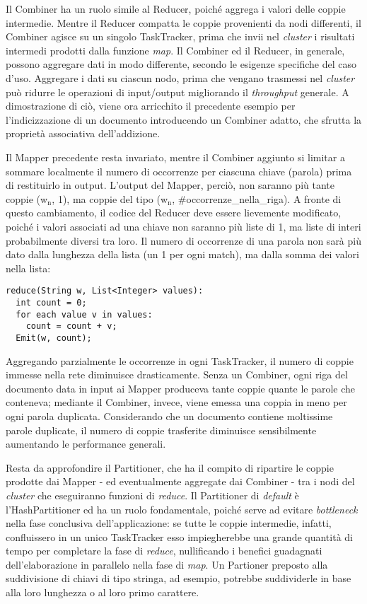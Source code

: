 Il Combiner ha un ruolo simile al Reducer, poiché aggrega i valori delle coppie intermedie. Mentre il Reducer compatta le coppie provenienti da nodi differenti, il Combiner 
agisce su un singolo TaskTracker, prima che invii nel \textit{cluster} i risultati intermedi prodotti dalla funzione \textit{map}. Il Combiner ed il Reducer, in generale, possono aggregare dati 
in modo differente, secondo le esigenze specifiche del caso d’uso. Aggregare i dati su ciascun nodo, prima che vengano trasmessi nel \textit{cluster} può ridurre le operazioni di 
input/output migliorando il \textit{throughput} generale. A dimostrazione di ciò, viene ora arricchito il precedente esempio per l’indicizzazione di un documento introducendo un Combiner 
adatto, che sfrutta la proprietà associativa dell’addizione.

Il Mapper precedente resta invariato, mentre il Combiner aggiunto si limitar a sommare localmente il numero di occorrenze per ciascuna chiave (parola) prima di restituirlo in output. 
L’output del Mapper, perciò, non saranno più tante coppie (w$_{\mathrm{n}}$, 1), ma coppie del tipo (w$_{\mathrm{n}}$, \#occorrenze\_nella\_riga). A fronte di questo cambiamento, il codice del Reducer deve essere
lievemente modificato, poiché i valori associati ad una chiave non saranno più liste di 1, ma liste di interi probabilmente diversi tra loro. Il numero di occorrenze di una parola 
non sarà più dato dalla lunghezza della lista (un 1 per ogni match), ma dalla somma dei valori nella lista: 

\begin{lstlisting}[frame=single]
reduce(String w, List<Integer> values):
  int count = 0;
  for each value v in values:
    count = count + v;
  Emit(w, count);
\end{lstlisting}

Aggregando parzialmente le occorrenze in ogni TaskTracker, il numero di coppie immesse nella rete diminuisce drasticamente. Senza un Combiner, ogni riga del documento data in 
input ai Mapper produceva tante coppie quante le parole che conteneva; mediante il Combiner, invece, viene emessa una coppia in meno per ogni parola duplicata. Considerando che
un documento contiene moltissime parole duplicate, il numero di coppie trasferite diminuisce sensibilmente aumentando le performance generali.

Resta da approfondire il Partitioner, che ha il compito di ripartire le coppie prodotte dai Mapper - ed eventualmente aggregate dai Combiner - tra i nodi del \textit{cluster} che 
eseguiranno funzioni di \textit{reduce}. Il Partitioner di \textit{default} è l’HashPartitioner ed ha un ruolo fondamentale, poiché serve ad evitare \textit{bottleneck} nella fase conclusiva dell’applicazione:
se tutte le coppie intermedie, infatti, confluissero in un unico TaskTracker esso impiegherebbe una grande quantità di tempo per completare la fase di \textit{reduce}, nullificando i 
benefici guadagnati dell’elaborazione in parallelo nella fase di \textit{map}. Un Partioner preposto alla suddivisione di chiavi di tipo stringa, ad esempio, potrebbe suddividerle in base 
alla loro lunghezza o al loro primo carattere.

